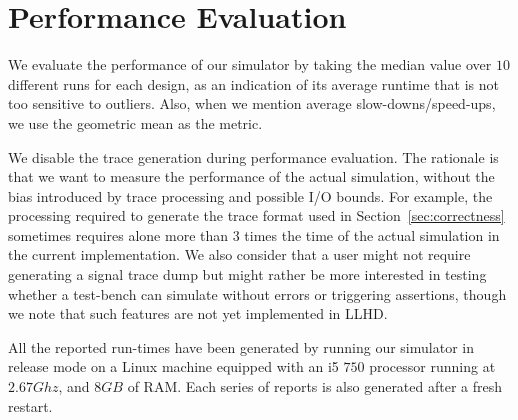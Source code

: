 
\section{Performance Evaluation}
We evaluate the performance of our simulator by taking the median value over $10$ different runs for each design, as an indication of its average runtime that is not too sensitive to outliers. Also, when we mention average slow-downs/speed-ups, we use the geometric mean as the metric.

We disable the trace generation during performance evaluation. The rationale is that we want to measure the performance of the actual simulation, without the bias introduced by trace processing and possible I/O bounds. For example, the processing required to generate the trace format used in Section~\ref{sec:correctness} sometimes requires alone more than $3$ times the time of the actual simulation in the current implementation. We also consider that a user might not require generating a signal trace dump but might rather be more interested in testing whether a test-bench can simulate without errors or triggering assertions, though we note that such features are not yet implemented in LLHD.

All the reported run-times have been generated by running our simulator in release mode on a Linux machine equipped with an i5 $750$ processor running at $2.67Ghz$, and $8GB$ of RAM. Each series of reports is also generated after a fresh restart.

